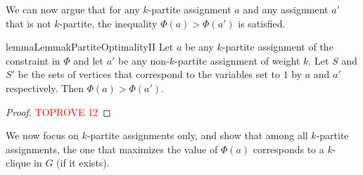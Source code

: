 \documentclass[a4paper,UKenglish,cleveref, autoref, thm-restate,numberwithinsect]{lipics-v2021}
\begin{document}
We can now argue that for any $k$-partite assignment $a$ and any assignment $a'$ that is not $k$-partite, the inequality $\Phi(a)>\Phi(a')$ is satisfied.
\begin{restatable}{lemma}{LemmakPartiteOptimalityII}\label{lemma:case2-optimality-of-k-partite-assignment}
    Let $a$ be any $k$-partite assignment of the constraint in $\Phi$ and let $a'$ be any non-$k$-partite assignment of weight $k$.
    Let $S$ and $S'$ be the sets of vertices that correspond to the variables set to $1$ by $a$ and $a'$ respectively.
    Then $\Phi(a)>\Phi(a')$.
\end{restatable}
\begin{proof}\textcolor{red}{TOPROVE 12}\end{proof}
We now focus on $k$-partite assignments only, and show that among all $k$-partite assignments, the one that maximizes the value of $\Phi(a)$ corresponds to a $k$-clique in $G$ (if it exists).
\end{document}
